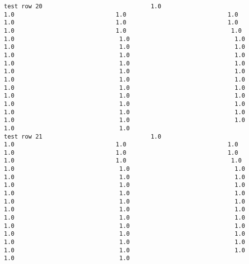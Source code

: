 \documentclass[11pt]{article}
\begin{document}
\begin{verbatim}
test row 20                               1.0                             1.0                             1.0                             1.0                             1.0                             1.0                             1.0                             1.0                             1.0                              1.0                              1.0                              1.0                              1.0                              1.0                              1.0                              1.0                              1.0                              1.0                              1.0                              1.0                              1.0                              1.0                              1.0                              1.0                              1.0                              1.0                              1.0                              1.0                              1.0                              1.0                              1.0                              1.0                              1.0                              1.0                              1.0                              1.0                              1.0                              1.0                              1.0                              1.0                              1.0                              1.0                              1.0                              1.0                              1.0
test row 21                               1.0                             1.0                             1.0                             1.0                             1.0                             1.0                             1.0                             1.0                             1.0                              1.0                              1.0                              1.0                              1.0                              1.0                              1.0                              1.0                              1.0                              1.0                              1.0                              1.0                              1.0                              1.0                              1.0                              1.0                              1.0                              1.0                              1.0                              1.0                              1.0                              1.0                              1.0                              1.0                              1.0                              1.0                              1.0                              1.0                              1.0                              1.0                              1.0                              1.0                              1.0                              1.0                              1.0                              1.0                              1.0

\end{verbatim}
\end{document}
